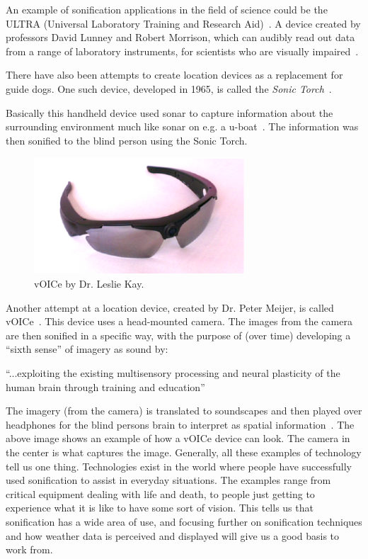An example of sonification applications in the field of science could be the ULTRA (Universal Laboratory Training and Research Aid)~\cite*{Morrison1984}.
A device created by professors David Lunney and Robert Morrison, which can audibly read out data from a range of laboratory instruments, for scientists who are visually impaired~\cite{Girvan2005}.

There have also been attempts to create location devices as a replacement for guide dogs. One such device, developed in 1965, is called the \emph{Sonic Torch}~\cite*{Ksonar}.

Basically this handheld device used sonar to capture information about the surrounding environment much like sonar on e.g. a u-boat~\cite*[1965]{Ksonar}. 
The information was then sonified to the blind person using the Sonic Torch.

\begin{figure}[!htbp]
    \centering
    \includegraphics[width=0.7\textwidth]{images/Sonification1.png}
    \caption{vOICe by Dr. Leslie Kay.}
    \label{fig:sonification1}
\end{figure}

Another attempt at a location device, created by Dr. Peter Meijer, is called vOICe~\cite*{Meijer2014}. 
This device uses a head-mounted camera. 
The images from the camera are then sonified in a specific way, with the purpose of (over time) developing a “sixth sense” of imagery as sound by:

\enquote{...exploiting the existing multisensory processing and neural plasticity of the human brain through training and education}~\cite*{Meijer2014}


The imagery (from the camera) is translated to soundscapes and then played over headphones for the blind persons brain to interpret as spatial information~\cite*{Sandhana2003}. 
The above image shows an example of how a vOICe device can look. 
The camera in the center is what captures the image.
Generally, all these examples of technology tell us one thing. 
Technologies exist in the world where people have successfully used sonification to assist in everyday situations. 
The examples range from critical equipment dealing with life and death, to people just getting to experience what it is like to have some sort of vision. 
This tells us that sonification has a wide area of use, and focusing further on sonification techniques and how weather data is perceived and displayed will give us a good basis to work from.


